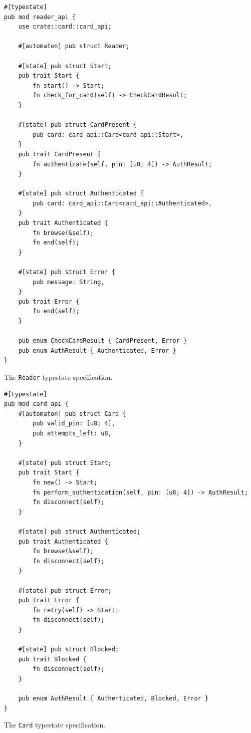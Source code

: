 \begin{listing}
    \begin{verbatim}
#[typestate]
pub mod reader_api {
    use crate::card::card_api;

    #[automaton] pub struct Reader;

    #[state] pub struct Start;
    pub trait Start {
        fn start() -> Start;
        fn check_for_card(self) -> CheckCardResult;
    }

    #[state] pub struct CardPresent {
        pub card: card_api::Card<card_api::Start>,
    }
    pub trait CardPresent {
        fn authenticate(self, pin: [u8; 4]) -> AuthResult;
    }

    #[state] pub struct Authenticated {
        pub card: card_api::Card<card_api::Authenticated>,
    }
    pub trait Authenticated {
        fn browse(&self);
        fn end(self);
    }

    #[state] pub struct Error {
        pub message: String,
    }
    pub trait Error {
        fn end(self);
    }

    pub enum CheckCardResult { CardPresent, Error }
    pub enum AuthResult { Authenticated, Error }
}
    \end{verbatim}
    \caption{The \texttt{Reader} typestate specification.}
    \label{lst:typestate-reader}
\end{listing}

\begin{listing}
    \begin{verbatim}
#[typestate]
pub mod card_api {
    #[automaton] pub struct Card {
        pub valid_pin: [u8; 4],
        pub attempts_left: u8,
    }

    #[state] pub struct Start;
    pub trait Start {
        fn new() -> Start;
        fn perform_authentication(self, pin: [u8; 4]) -> AuthResult;
        fn disconnect(self);
    }

    #[state] pub struct Authenticated;
    pub trait Authenticated {
        fn browse(&self);
        fn disconnect(self);
    }

    #[state] pub struct Error;
    pub trait Error {
        fn retry(self) -> Start;
        fn disconnect(self);
    }

    #[state] pub struct Blocked;
    pub trait Blocked {
        fn disconnect(self);
    }

    pub enum AuthResult { Authenticated, Blocked, Error }
}
    \end{verbatim}
    \caption{The \texttt{Card} typestate specification.}
    \label{lst:typestate-card}
\end{listing}


